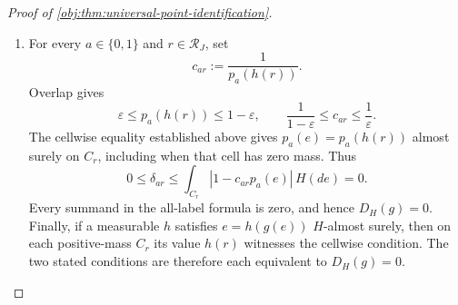 \begin{proof}[Proof of \cref{obj:thm:universal-point-identification}]
\begin{enumerate}
\item For every \(a\in\{0,1\}\) and \(r\in\mathcal R_J\), set
\[
c_{ar}:=\frac{1}{p_a(h(r))}.
\]
Overlap gives
\[
\varepsilon\leq p_a(h(r))\leq1-\varepsilon,
\qquad
\frac1{1-\varepsilon}\leq c_{ar}\leq\frac1\varepsilon.
\]
The cellwise equality established above gives \(p_a(e)=p_a(h(r))\) almost surely on \(C_r\), including when that cell has zero mass. Thus
\[
0\leq\delta_{ar}
\leq\int_{C_r}|1-c_{ar}p_a(e)|\,H(de)=0.
\]
Every summand in the all-label formula is zero, and hence \(D_H(g)=0\). Finally, if a measurable \(h\) satisfies \(e=h(g(e))\) \(H\)-almost surely, then on each positive-mass \(C_r\) its value \(h(r)\) witnesses the cellwise condition. The two stated conditions are therefore each equivalent to \(D_H(g)=0\). %
\end{enumerate}
\end{proof}

